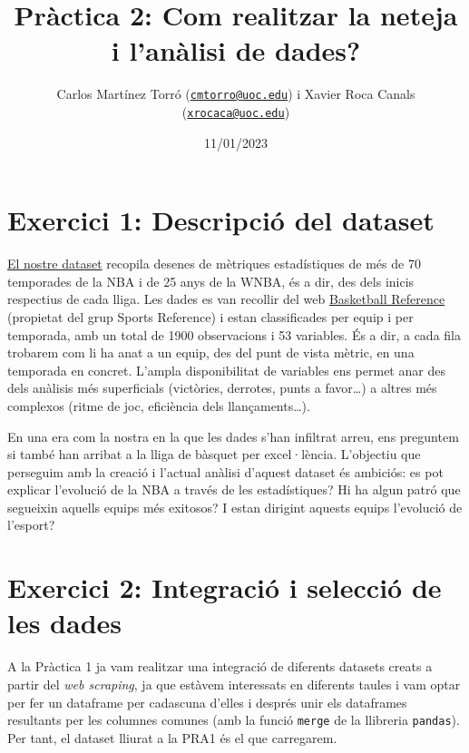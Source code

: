 \documentclass[
]{article}
\title{\textbf{Pràctica 2: Com realitzar la neteja i l'anàlisi de
dades?}}
\author{Carlos Martínez Torró
(\href{mailto:cmtorro@uoc.edu}{\nolinkurl{cmtorro@uoc.edu}}) i Xavier
Roca Canals
(\href{mailto:xrocaca@uoc.edu}{\nolinkurl{xrocaca@uoc.edu}})}
\date{11/01/2023}
\begin{document}
\maketitle

\renewcommand*\contentsname{Índex de la pràctica}
{
\setcounter{tocdepth}{2}
\tableofcontents
}
\newpage

\hypertarget{exercici-1-descripciuxf3-del-dataset}{%
\section{Exercici 1: Descripció del
dataset}\label{exercici-1-descripciuxf3-del-dataset}}

\href{https://zenodo.org/record/7343400}{El nostre dataset} recopila
desenes de mètriques estadístiques de més de 70 temporades de la NBA i
de 25 anys de la WNBA, és a dir, des dels inicis respectius de cada
lliga. Les dades es van recollir del web
\href{https://www.basketball-reference.com/}{Basketball Reference}
(propietat del grup Sports Reference) i estan classificades per equip i
per temporada, amb un total de 1900 observacions i 53 variables. És a
dir, a cada fila trobarem com li ha anat a un equip, des del punt de
vista mètric, en una temporada en concret. L'ampla disponibilitat de
variables ens permet anar des dels anàlisis més superficials (victòries,
derrotes, punts a favor\ldots) a altres més complexos (ritme de joc,
eficiència dels llançaments\ldots).

En una era com la nostra en la que les dades s'han infiltrat arreu, ens
preguntem si també han arribat a la lliga de bàsquet per excel·lència.
L'objectiu que perseguim amb la creació i l'actual anàlisi d'aquest
dataset és ambiciós: es pot explicar l'evolució de la NBA a través de
les estadístiques? Hi ha algun patró que segueixin aquells equips més
exitosos? I estan dirigint aquests equips l'evolució de l'esport?

\hypertarget{exercici-2-integraciuxf3-i-selecciuxf3-de-les-dades}{%
\section{Exercici 2: Integració i selecció de les
dades}\label{exercici-2-integraciuxf3-i-selecciuxf3-de-les-dades}}

A la Pràctica 1 ja vam realitzar una integració de diferents datasets
creats a partir del \emph{web scraping}, ja que estàvem interessats en
diferents taules i vam optar per fer un dataframe per cadascuna d'elles
i després unir els dataframes resultants per les columnes comunes (amb
la funció \texttt{merge} de la llibreria \texttt{pandas}). Per tant, el
dataset lliurat a la PRA1 és el que carregarem.
\end{document}
